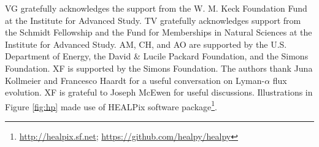 \acknowledgements

VG gratefully acknowledges the support from the W. M. Keck Foundation Fund at the Institute for Advanced Study. TV gratefully acknowledges support from the Schmidt Fellowship and the Fund for Memberships in Natural Sciences at the Institute for Advanced Study. AM, CH, and AO are supported by the U.S. Department of Energy, the David \& Lucile Packard Foundation, and the Simons Foundation. XF is supported by the Simons Foundation. The authors thank Juna Kollmeier and Francesco Haardt for a useful conversation on Lyman-$\alpha$ flux evolution. XF is grateful to Joseph McEwen for useful discussions. Illustrations in Figure \ref{fig:hp} made use of HEALPix \cite{2005ApJ...622..759G} software package\footnote{\url{ http://healpix.sf.net}; \url{https://github.com/healpy/healpy}}.